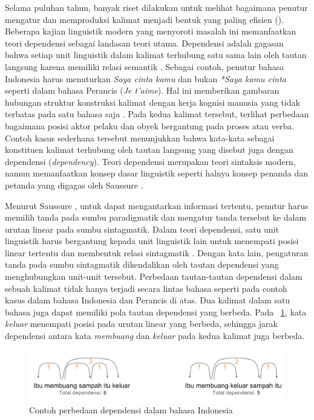 Selama puluhan tahun, banyak riset dilakukan untuk melihat bagaimana penutur mengatur dan memproduksi kalimat menjadi bentuk yang paling efisien (\citealp{chomsky2005three, hawkins2004efficiency, zipf1935psycho, zipf1949human}). Beberapa kajian linguistik modern yang menyoroti masalah ini memanfaatkan teori dependensi sebagai landasan teori utama. Dependensi adalah gagasan bahwa setiap unit linguistik dalam kalimat terhubung satu sama lain oleh tautan langsung karena memiliki relasi semantik \citep{tesniere1959elements}. Sebagai contoh, penutur bahasa Indonesia harus menuturkan \textit{Saya cinta kamu} dan bukan \textit{*Saya kamu cinta} seperti dalam bahasa Perancis (\textit{Je t'aime}). Hal ini memberikan gambaran hubungan struktur konstruksi kalimat dengan kerja kognisi manusia yang tidak terbatas pada satu bahasa saja \citep{gibson2000dependency}. Pada kedua kalimat tersebut, terlihat perbedaan bagaimana posisi aktor pelaku dan obyek bergantung pada proses atau verba. Contoh kasus sederhana tersebut menunjukkan bahwa kata-kata sebagai konstituen kalimat terhubung oleh tautan langsung yang disebut juga dengan dependensi (\textit{dependency}). Teori dependensi merupakan teori sintaksis modern, namun memanfaatkan konsep dasar linguistik seperti halnya konsep penanda dan petanda yang digagas oleh Saussure \citep{key2017course}. 

Menurut Saussure \citep{key2017course}, untuk dapat mengantarkan informasi tertentu, penutur harus memilih tanda pada sumbu paradigmatik dan mengatur tanda tersebut ke dalam urutan linear pada sumbu sintagmatik. Dalam teori dependensi, satu unit linguistik harus bergantung kepada unit linguistik lain untuk menempati posisi linear tertentu dan membentuk relasi sintagmatik \citep[p. 11-14]{tesniere1959elements}. Dengan kata lain, pengaturan tanda pada sumbu sintagmatik dikendalikan oleh tautan dependensi yang menghubungkan unit-unit tersebut. Perbedaan tautan-tautan dependensi dalam sebuah kalimat tidak hanya terjadi secara lintas bahasa seperti pada contoh kasus dalam bahasa Indonesia dan Perancis di atas. Dua kalimat dalam satu bahasa juga dapat memiliki pola tautan dependensi yang berbeda. Pada \pic~\ref{fig:contoh-dependensi}, kata \textit{keluar} menempati posisi pada urutan linear yang berbeda, sehingga jarak dependensi antara kata \textit{membuang} dan \textit{keluar} pada kedua kalimat juga berbeda. 
\begin{figure}
	\centering \includegraphics[width=1
	\textwidth] {pics/contoh-dependensi.png} \caption{Contoh perbedaan dependensi dalam bahasa Indonesia} 
\label{fig:contoh-dependensi} \end{figure}

